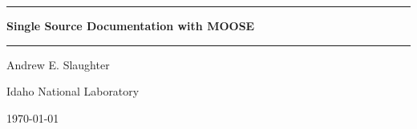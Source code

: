 \documentclass[12pt]{article}
\begin{document}
\begin{titlepage}
  \begin{center}
    \rule{\linewidth}{2pt}\par
    \bigskip
        {\huge \textbf{Single Source Documentation with MOOSE}}
    \smallskip
    \rule{\linewidth}{1pt}\par
    
    
    \vfill
    Andrew E. Slaughter\par
    
    \vfill
    
    Idaho National Laboratory\par
    \medskip
    
    
    \today\par
    \smallskip
    
    \end{center}
\end{titlepage}


\tableofcontents\newpage
\end{document}
